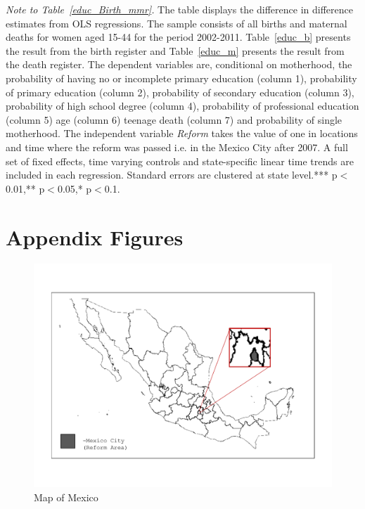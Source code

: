 \documentclass[a4paper, 11pt]{article}
\begin{document}
\begin{spacing}{1.4}
\begin{table}[H]
\begin{threeparttable}
    \begin{tablenotes} 
      \footnotesize	\item \textit{Note to Table~\ref{educ_Birth_mmr}.} The table displays the difference in difference estimates from OLS regressions. The sample consists of all births and maternal deaths for women aged 15-44 for the period 2002-2011. Table~\ref{educ_b} presents the result from the birth register and Table~\ref{educ_m} presents the result from the death register. The dependent variables are, conditional on motherhood, the probability of having no or incomplete primary education (column 1), probability of primary education (column 2), probability of secondary education (column 3), probability of high school degree (column 4), probability of professional education (column 5) age (column 6) teenage death (column 7) and probability of single motherhood. The independent variable \textit{Reform} takes the value of one in locations and time where the reform was passed i.e. in the Mexico City after 2007. A full set of fixed effects, time varying controls and state-specific linear time trends are included in each regression. Standard errors are clustered at state level.*** p$<$0.01,** p$<$0.05,* p$<$0.1.  
    \end{tablenotes}
  \end{threeparttable}
\end{table}


\section{Appendix Figures}
\begin{figure}[H]
  \caption{Map of Mexico}\label{Map}\centering
  \includegraphics[scale=0.6]{figures/MapMexico.pdf}
\end{figure}
 

\end{spacing}
\end{document}
